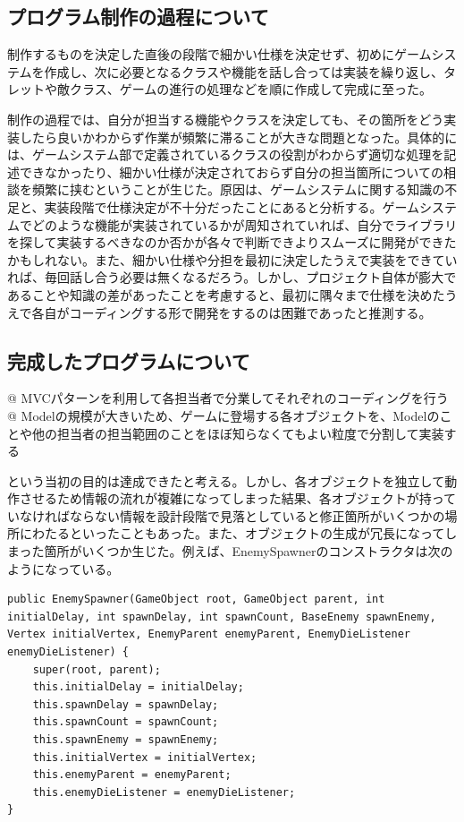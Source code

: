 \documentclass[11pt,a4j]{jarticle}
\begin{document}
\subsection{プログラム制作の過程について}

制作するものを決定した直後の段階で細かい仕様を決定せず、初めにゲームシステムを作成し、次に必要となるクラスや機能を話し合っては実装を繰り返し、タレットや敵クラス、ゲームの進行の処理などを順に作成して完成に至った。

制作の過程では、自分が担当する機能やクラスを決定しても、その箇所をどう実装したら良いかわからず作業が頻繁に滞ることが大きな問題となった。具体的には、ゲームシステム部で定義されているクラスの役割がわからず適切な処理を記述できなかったり、細かい仕様が決定されておらず自分の担当箇所についての相談を頻繁に挟むということが生じた。原因は、ゲームシステムに関する知識の不足と、実装段階で仕様決定が不十分だったことにあると分析する。ゲームシステムでどのような機能が実装されているかが周知されていれば、自分でライブラリを探して実装するべきなのか否かが各々で判断できよりスムーズに開発ができたかもしれない。また、細かい仕様や分担を最初に決定したうえで実装をできていれば、毎回話し合う必要は無くなるだろう。しかし、プロジェクト自体が膨大であることや知識の差があったことを考慮すると、最初に隅々まで仕様を決めたうえで各自がコーディングする形で開発をするのは困難であったと推測する。

\subsection{完成したプログラムについて}

\begin{easylist}[itemize]
    @ MVCパターンを利用して各担当者で分業してそれぞれのコーディングを行う
    @ Modelの規模が大きいため、ゲームに登場する各オブジェクトを、Modelのことや他の担当者の担当範囲のことをほぼ知らなくてもよい粒度で分割して実装する
\end{easylist}
という当初の目的は達成できたと考える。しかし、各オブジェクトを独立して動作させるため情報の流れが複雑になってしまった結果、各オブジェクトが持っていなければならない情報を設計段階で見落としていると修正箇所がいくつかの場所にわたるといったこともあった。また、オブジェクトの生成が冗長になってしまった箇所がいくつか生じた。例えば、EnemySpawnerのコンストラクタは次のようになっている。

\begin{lstlisting}[numbers=none]
public EnemySpawner(GameObject root, GameObject parent, int initialDelay, int spawnDelay, int spawnCount, BaseEnemy spawnEnemy, Vertex initialVertex, EnemyParent enemyParent, EnemyDieListener enemyDieListener) {
    super(root, parent);
    this.initialDelay = initialDelay;
    this.spawnDelay = spawnDelay;
    this.spawnCount = spawnCount;
    this.spawnEnemy = spawnEnemy;
    this.initialVertex = initialVertex;
    this.enemyParent = enemyParent;
    this.enemyDieListener = enemyDieListener;
}
\end{lstlisting}
\end{document}
